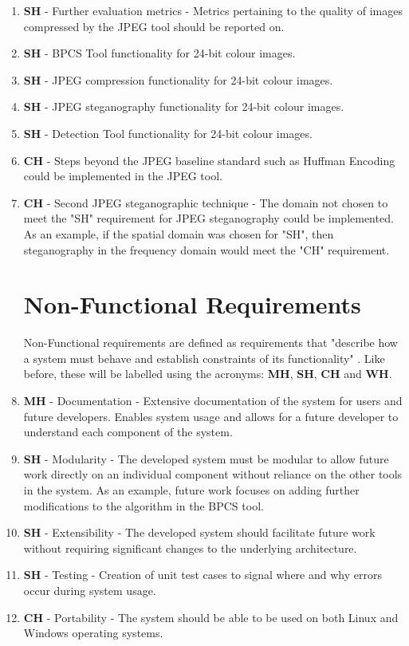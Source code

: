\documentclass{l4proj}
\begin{document}
\begin{enumerate}
    \item \textbf{SH} - Further evaluation metrics - Metrics pertaining to the quality of images compressed by the JPEG tool should be reported on.
    \item \textbf{SH} - BPCS Tool functionality for 24-bit colour images.
    \item \textbf{SH} - JPEG compression functionality for 24-bit colour images.
    \item \textbf{SH} - JPEG steganography functionality for 24-bit colour images.
    \item \textbf{SH} - Detection Tool functionality for 24-bit colour images.
    \item \textbf{CH} - Steps beyond the JPEG baseline standard such as Huffman Encoding could be implemented in the JPEG tool. 
    \item \textbf{CH} - Second JPEG steganographic technique - The domain not chosen to meet the "SH" requirement for JPEG steganography could be implemented. As an example, if the spatial domain was chosen for "SH", then steganography in the frequency domain would meet the "CH" requirement.

\section{Non-Functional Requirements}\label{non_functional_requirements}

Non-Functional requirements are defined as requirements that "describe how a system must behave and establish constraints of its functionality" \citep{functional_non_functional}. Like before, these will be labelled using the acronyms: \textbf{MH}, \textbf{SH}, \textbf{CH} and \textbf{WH}. 

    \item \textbf{MH} - Documentation - Extensive documentation of the system for users and future developers. Enables system usage and allows for a future developer to understand each component of the system.
    \item \textbf{SH} - Modularity - The developed system must be modular to allow future work directly on an individual component without reliance on the other tools in the system. As an example, future work focuses on adding further modifications to the algorithm in the BPCS tool. 
    \item \textbf{SH} - Extensibility - The developed system should facilitate future work without requiring significant changes to the underlying architecture. 
    \item \textbf{SH} - Testing - Creation of unit test cases to signal where and why errors occur during system usage. 
    \item \textbf{CH} - Portability - The system should be able to be used on both Linux and Windows operating systems.
\end{enumerate}
\end{document}
